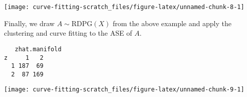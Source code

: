 \documentclass[
  11pt,
]{article}
\begin{document}
\begin{center}\texttt{[image: curve-fitting-scratch\_files/figure-latex/unnamed-chunk-8-1]} \end{center}

\begin{example}

Finally, we draw $A \sim \mathrm{RDPG}(X)$ from the above example and apply the clustering and curve fitting to the ASE of $A$.

\end{example}

\begin{verbatim}
   zhat.manifold
z     1   2
  1 187  69
  2  87 169
\end{verbatim}

\begin{center}\texttt{[image: curve-fitting-scratch\_files/figure-latex/unnamed-chunk-9-1]} \end{center}

  
\end{document}

